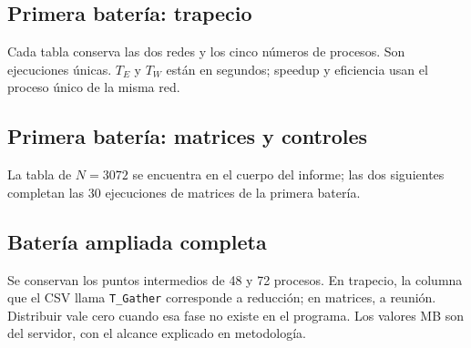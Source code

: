 \subsection{Primera batería: trapecio}
Cada tabla conserva las dos redes y los cinco números de procesos. Son ejecuciones únicas. $T_E$ y $T_W$ están en segundos; speedup y eficiencia usan el proceso único de la misma red.
\begin{table}[H]\caption{Trapecio, $n=10^8$.}\end{table}
\begin{table}[H]\caption{Trapecio, $n=10^{11}$.}\end{table}

\subsection{Primera batería: matrices y controles}
La tabla de $N=3072$ se encuentra en el cuerpo del informe; las dos siguientes completan las 30 ejecuciones de matrices de la primera batería.
\begin{table}[H]\caption{Matrices, $N=1024$.}\end{table}
\begin{table}[H]\caption{Matrices, $N=2048$.}\end{table}
\begin{table}[H]\caption{Huellas impresas en las matrices de la primera batería. Su coincidencia es un control de consistencia, no una comparación completa elemento por elemento.}\end{table}

\subsection{Batería ampliada completa}
Se conservan los puntos intermedios de 48 y 72 procesos. En trapecio, la columna que el CSV llama \texttt{T\_Gather} corresponde a reducción; en matrices, a reunión. Distribuir vale cero cuando esa fase no existe en el programa. Los valores MB son del servidor, con el alcance explicado en metodología.
\begin{landscape}\footnotesize\renewcommand{\arraystretch}{1.0}

\end{landscape}


